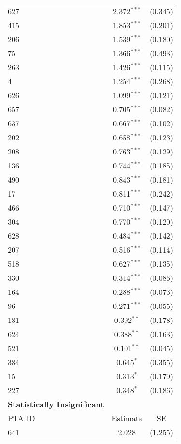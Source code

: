\begin{center}
\begin{longtable}{lcc}
    627 & 2.372$^{\ast\ast\ast}$ & (0.345) \\
    415 & 1.853$^{\ast\ast\ast}$ & (0.201) \\
    206 & 1.539$^{\ast\ast\ast}$ & (0.180) \\
    75  & 1.366$^{\ast\ast\ast}$ & (0.493) \\
    263 & 1.426$^{\ast\ast\ast}$ & (0.115) \\
    4   & 1.254$^{\ast\ast\ast}$ & (0.268) \\
    626 & 1.099$^{\ast\ast\ast}$ & (0.121) \\
    657 & 0.705$^{\ast\ast\ast}$ & (0.082) \\
    637 & 0.667$^{\ast\ast\ast}$ & (0.102) \\
    202 & 0.658$^{\ast\ast\ast}$ & (0.123) \\
    208 & 0.763$^{\ast\ast\ast}$ & (0.129) \\
    136 & 0.744$^{\ast\ast\ast}$ & (0.185) \\
    490 & 0.843$^{\ast\ast\ast}$ & (0.181) \\
    17  & 0.811$^{\ast\ast\ast}$ & (0.242) \\
    466 & 0.710$^{\ast\ast\ast}$ & (0.147) \\
    304 & 0.770$^{\ast\ast\ast}$ & (0.120) \\
    628 & 0.484$^{\ast\ast\ast}$ & (0.142) \\
    207 & 0.516$^{\ast\ast\ast}$ & (0.114) \\
    518 & 0.627$^{\ast\ast\ast}$ & (0.135) \\
    330 & 0.314$^{\ast\ast\ast}$ & (0.086) \\
    164 & 0.288$^{\ast\ast\ast}$ & (0.073) \\
    96 & 0.271$^{\ast\ast\ast}$ & (0.055) \\
    181 & 0.392$^{\ast\ast}$ & (0.178) \\
    624 & 0.388$^{\ast\ast}$ & (0.163) \\
    521 & 0.101$^{\ast\ast}$ & (0.045) \\
    384  & 0.645$^{\ast}$ & (0.355) \\
    15  & 0.313$^{\ast}$ & (0.179) \\
    227 & 0.348$^{\ast}$ & (0.186) \\
    \hline
    \textbf{Statistically Insignificant} &  &  \\
    \hline
    PTA ID & Estimate & SE \\
    \hline
    641 & 2.028 & (1.255) \\

\end{longtable}
\end{center}
